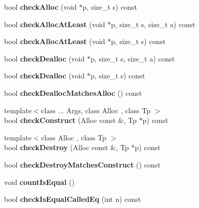\begin{DoxyCompactItemize}
\item 
\mbox{\label{struct_alloc_controller_aa9460d82104a53a8b520260ac7e84da1}} 
bool {\bfseries check\+Alloc} (void $\ast$p, size\+\_\+t s) const
\item 
\mbox{\label{struct_alloc_controller_a88545e64d7e99aeb680fb13073a6ccf9}} 
bool {\bfseries check\+Alloc\+At\+Least} (void $\ast$p, size\+\_\+t s, size\+\_\+t a) const
\item 
\mbox{\label{struct_alloc_controller_af1d18c7e8844eabbfbba1b3be5601acb}} 
bool {\bfseries check\+Alloc\+At\+Least} (void $\ast$p, size\+\_\+t s) const
\item 
\mbox{\label{struct_alloc_controller_ac53a0ca94d8f8a3ef2d72617b3ede673}} 
bool {\bfseries check\+Dealloc} (void $\ast$p, size\+\_\+t s, size\+\_\+t a) const
\item 
\mbox{\label{struct_alloc_controller_ab6bd59dd55e7678424e13ee4a9c9ffff}} 
bool {\bfseries check\+Dealloc} (void $\ast$p, size\+\_\+t s) const
\item 
\mbox{\label{struct_alloc_controller_a1541d1b607fc7bd4bbf61441efc0f65d}} 
bool {\bfseries check\+Dealloc\+Matches\+Alloc} () const
\item 
\mbox{\label{struct_alloc_controller_a48ffbd41c9a1f0fa7d5e47fbd84962b9}} 
{\footnotesize template$<$class ... Args, class Alloc , class Tp $>$ }\\bool {\bfseries check\+Construct} (Alloc const \&, Tp $\ast$p) const
\item 
\mbox{\label{struct_alloc_controller_af69eb64815abcdfb9b7a9c4f771f2610}} 
{\footnotesize template$<$class Alloc , class Tp $>$ }\\bool {\bfseries check\+Destroy} (Alloc const \&, Tp $\ast$p) const
\item 
\mbox{\label{struct_alloc_controller_a80204e606c31e54f893134110f71a958}} 
bool {\bfseries check\+Destroy\+Matches\+Construct} () const
\item 
\mbox{\label{struct_alloc_controller_a2ceab5ce04f1df16f90f8ad61dbf0de3}} 
void {\bfseries count\+Is\+Equal} ()
\item 
\mbox{\label{struct_alloc_controller_a4c02d63c6cda7eef2e4c97bfb9162533}} 
bool {\bfseries check\+Is\+Equal\+Called\+Eq} (int n) const
\end{DoxyCompactItemize}
